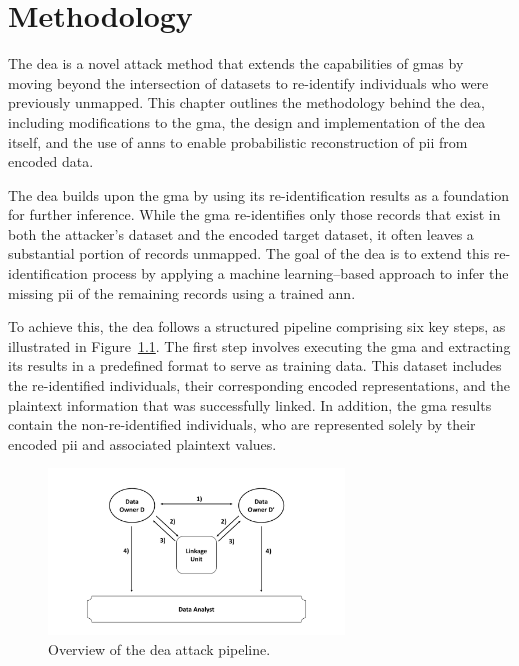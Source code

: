 \chapter{Methodology}  \label{sec:method}
The \ac{dea} is a novel attack method that extends the capabilities of \ac{gma}s by moving beyond the intersection of datasets to re-identify individuals who were previously unmapped.
This chapter outlines the methodology behind the \ac{dea}, including modifications to the \ac{gma}, the design and implementation of the \ac{dea} itself, and the use of \ac{ann}s to enable probabilistic reconstruction of \ac{pii} from encoded data.

The \ac{dea} builds upon the \ac{gma} by using its re-identification results as a foundation for further inference.
While the \ac{gma} re-identifies only those records that exist in both the attacker’s dataset and the encoded target dataset, it often leaves a substantial portion of records unmapped.
The goal of the \ac{dea} is to extend this re-identification process by applying a machine learning–based approach to infer the missing \ac{pii} of the remaining records using a trained \ac{ann}.

To achieve this, the \ac{dea} follows a structured pipeline comprising six key steps, as illustrated in Figure~\ref{fig:deaoverview}.
The first step involves executing the \ac{gma} and extracting its results in a predefined format to serve as training data.
This dataset includes the re-identified individuals, their corresponding encoded representations, and the plaintext information that was successfully linked.
In addition, the \ac{gma} results contain the non-re-identified individuals, who are represented solely by their encoded \ac{pii} and associated plaintext values.

\begin{figure}[H]
    \centering
    \includegraphics[width=0.7\textwidth, page=15]{img/visualization.pdf}
    \caption{Overview of the \ac{dea} attack pipeline.}
    \label{fig:deaoverview}
\end{figure}

